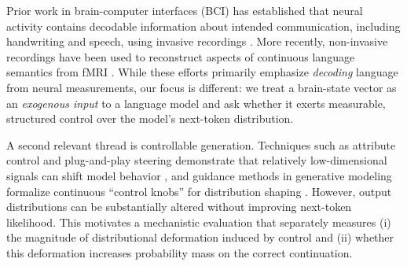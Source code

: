 \documentclass{article}
\theoremstyle{plain}
\theoremstyle{definition}
\theoremstyle{remark}
\begin{document}
Prior work in brain-computer interfaces (BCI) has established that neural activity contains decodable information about intended communication, including handwriting and speech, using invasive recordings \citep{anumanchipalli2019speechsynthesis,makin2020handwriting,willett2021handwriting,moses2021neuroprosthesis,willett2023speechavatar}.
More recently, non-invasive recordings have been used to reconstruct aspects of continuous language semantics from fMRI \citep{tang2023semanticreconstruction}.
While these efforts primarily emphasize \emph{decoding} language from neural measurements, our focus is different: we treat a brain-state vector as an \emph{exogenous input} to a language model and ask whether it exerts measurable, structured control over the model's next-token distribution.

A second relevant thread is controllable generation.
Techniques such as attribute control and plug-and-play steering demonstrate that relatively low-dimensional signals can shift model behavior \citep{keskar2019ctrl,dathathri2020pplm}, and guidance methods in generative modeling formalize continuous ``control knobs'' for distribution shaping \citep{dhariwal2021diffusionbeatgans}.
However, output distributions can be substantially altered without improving next-token likelihood.
This motivates a mechanistic evaluation that separately measures (i) the magnitude of distributional deformation induced by control and (ii) whether this deformation increases probability mass on the correct continuation.
\end{document}
